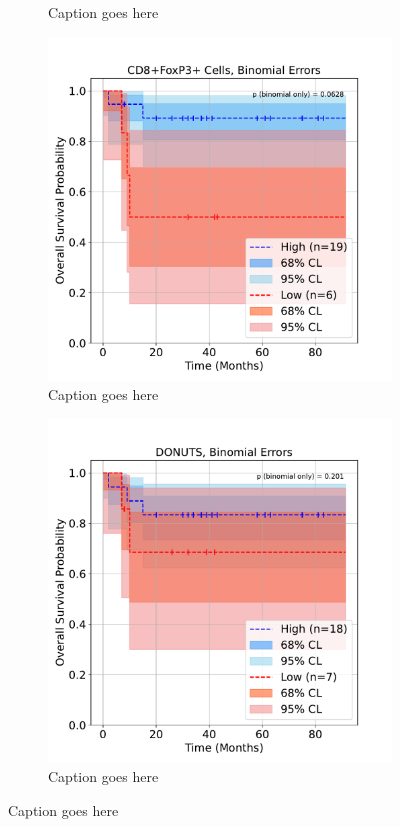 \documentclass[article]{jss}
\begin{document}
\begin{figure}
\begin{subfigure}[t]{0.49\textwidth}
    \caption{\label{fig:lung-dataset-donuts-patient-wise} Caption goes here}
  \end{subfigure}
  \begin{subfigure}[t]{0.49\textwidth}
    \centering
    \includegraphics{lung_cells_km_OS_binomial.pdf}
    \caption{\label{fig:lung-dataset-cells-binomial} Caption goes here}
  \end{subfigure}
  \begin{subfigure}[t]{0.49\textwidth}
    \centering
    \includegraphics{lung_donuts_km_OS_binomial.pdf}
    \caption{\label{fig:lung-dataset-donuts-binomial} Caption goes here}
  \end{subfigure}
  \caption{\label{fig:lung-dataset} Caption goes here}
\end{figure}
\end{document}
